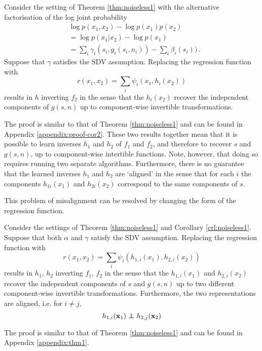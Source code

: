 \medskip

\begin{corollary}
	\label{crl:noiseless1}
	Consider the setting of Theorem \ref{thm:noiseless1} with the alternative factorisation of the log joint probability
	\begin{align}
	&\log p({x}_1, {x}_2) - \log p({x}_1) p({x}_2) \nonumber \\
	&= \log p({x}_1 | {x}_2) - \log p({x}_1)\nonumber \\
	&= \sum_i \gamma_i(s_{i}, g_i(s_i, n_i)) - \sum_i \beta_i(s_i)) \label{eq:logdens_noiesless_2}\,.
	\end{align}
	Suppose that ${\gamma}$ satisfies the SDV assumption.
	Replacing the regression function with
	\begin{equation*}
	r({x}_{1},{x}_{2})=\sum_{i}\psi_{i}({x}_{1}, h_{i}({x}_{2}))
	\end{equation*}
	results in ${h}$ inverting ${f}_2$ in the sense that the $h_{i}({x}_2)$ recover the independent components of ${g}({s}, {n})$ up  to component-wise invertible transformations.
\end{corollary}
The proof is similar to that of Theorem \ref{thm:noiseless1} and can be found in Appendix \ref{appendix:proof-cor2}.
These two results together mean that it is possible to learn inverses ${h}_1$ and ${h}_2$ of ${f}_1$ and ${f}_2$, and therefore to recover ${s}$ and ${g}({s}, {n})$, up to component-wise intertible functions.
Note, however, that doing so requires running two separate algorithms.
Furthermore, there is no guarantee that the learned inverses ${h}_1$ and ${h}_2$ are `aligned' in the sense that for each $i$ the components ${h}_{1i}({x}_1)$ and ${h}_{2i}({x}_2)$ correspond to the same components of ${s}$.

This problem of misalignment can be resolved by changing the form of the regression function.

\medskip

\begin{theorem}\label{thm:demixing}
	Consider the settings of Theorem \ref{thm:noiseless1} and Corollary \ref{crl:noiseless1}.
	Suppose that both ${\alpha}$ and ${\gamma}$ satisfy the SDV assumption.
	Replacing the regression function with
	\begin{equation}\label{eqn:double-regression-fn}
	r({x}_{1},{x}_{2})=\sum_{i}\psi_{i}(h_{1,i}({x}_{1}),h_{2,i}({x}_{2}))
	\end{equation}
	results in ${h}_1$, ${h}_2$ inverting ${f}_1$, ${f}_2$ in the sense that the $h_{1,i}({x}_1)$ and $h_{2,i}({x}_2)$ recover the independent components of ${s}$ and ${g}({s}, {n})$ up to two different component-wise invertible transformations. Furthermore, the two representations are aligned, i.e. for $i\not=j$,
	\begin{equation*}
	h_{1,i}(\mathbf{x}_{1})\independent h_{2,j}(\mathbf{x}_{2})
	\end{equation*}
\end{theorem}
The proof is similar to that of Theorem \ref{thm:noiseless1} and can be found in Appendix \ref{appendix:thm1}.

